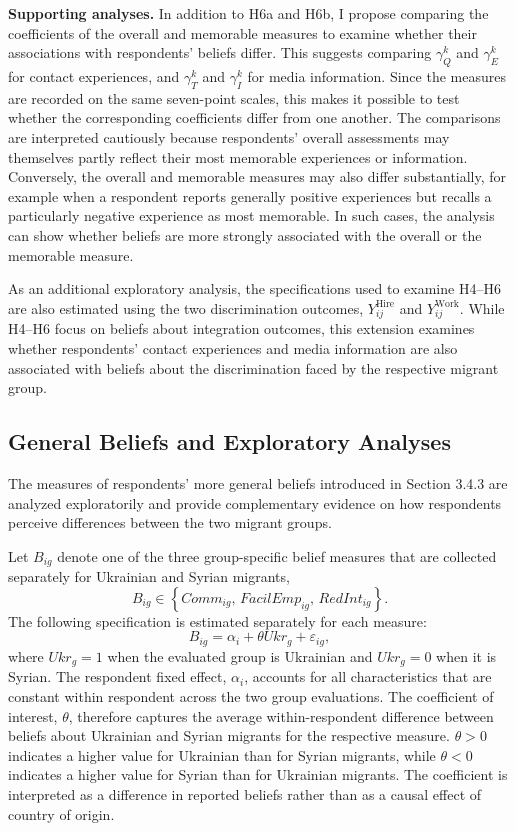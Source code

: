 \noindent\textbf{Supporting analyses.} In addition to H6a and H6b, I propose comparing the coefficients of the overall 
and memorable measures to examine whether their associations with respondents’ beliefs differ. This suggests comparing 
\(\gamma_Q^{k}\) and \(\gamma_E^{k}\) for contact experiences, and \(\gamma_T^{k}\) and \(\gamma_I^{k}\) for media 
information. Since the measures are recorded on the same seven-point scales, this makes it possible to test whether 
the corresponding coefficients differ from one another. The comparisons are interpreted cautiously because respondents’ 
overall assessments may themselves partly reflect their most memorable experiences or information. Conversely, the 
overall and memorable measures may also differ substantially, for example when a respondent reports generally positive 
experiences but recalls a particularly negative experience as most memorable. In such cases, the analysis can show 
whether beliefs are more strongly associated with the overall or the memorable measure.

As an additional exploratory analysis, the specifications used to examine H4--H6 are also estimated using the two 
discrimination outcomes, \(Y_{ij}^{\mathrm{Hire}}\) and \(Y_{ij}^{\mathrm{Work}}\). While H4--H6 focus on beliefs 
about integration outcomes, this extension examines whether respondents' contact experiences and media 
information are also associated with beliefs about the discrimination faced by the respective migrant group. 

\subsection{General Beliefs and Exploratory Analyses}

The measures of respondents' more general beliefs introduced in Section 3.4.3 are analyzed 
exploratorily and provide complementary evidence on how respondents perceive differences between the two migrant groups.

Let \(B_{ig}\) denote one of 
the three group-specific belief measures that are collected separately for Ukrainian and Syrian migrants,
\[
B_{ig}
\in
\left\{
Comm_{ig},\,
FacilEmp_{ig},\,
RedInt_{ig}
\right\}.
\]
The following specification is estimated separately for each measure:
\begin{equation}
B_{ig}
=
\alpha_i
+
\theta Ukr_g
+
\varepsilon_{ig},
\end{equation}
where \(Ukr_g=1\) when the evaluated group is Ukrainian and \(Ukr_g=0\) when it is Syrian. The respondent fixed effect, 
\(\alpha_i\), accounts for all characteristics that are constant within respondent across the two group evaluations. 
The coefficient of interest, \(\theta\), therefore captures the average within-respondent difference between beliefs 
about Ukrainian and Syrian migrants for the respective measure. \(\theta>0\) indicates a higher value for Ukrainian 
than for Syrian migrants, while \(\theta<0\) indicates a higher value for Syrian than for Ukrainian migrants.
The coefficient is interpreted as a difference in reported beliefs rather than as a causal effect of country of origin.


